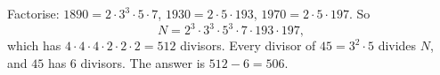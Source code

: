 Factorise: $1890=2\cdot3^3\cdot5\cdot7$, $1930=2\cdot5\cdot193$, $1970=2\cdot5\cdot197$. So
\[
N=2^3\cdot3^3\cdot5^3\cdot7\cdot193\cdot197,
\]
which has $4\cdot4\cdot4\cdot2\cdot2\cdot2=512$ divisors. Every divisor of $45=3^2\cdot5$ divides $N$, and $45$ has $6$ divisors. The answer is $512-6=\boxed{506}$.
